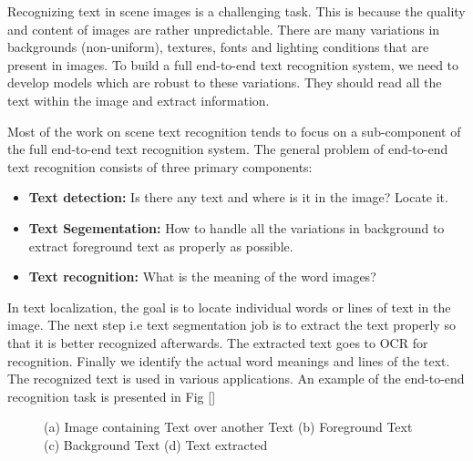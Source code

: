 Recognizing text in scene images is a challenging task.
This is because the quality and content of images are
rather unpredictable. There are many variations in backgrounds (non-uniform), textures,
fonts and lighting conditions that are present in images.
To build a full end-to-end text recognition system, we need to develop models
which are robust to these variations. They should read all the text within the image and extract information. 
 
Most of the work on scene text recognition tends to focus on a sub-component of the
full end-to-end text recognition system.
The general problem of end-to-end text recognition
consists of three primary components:  

\begin{itemize}
 \item \textbf{Text detection:} Is there any text and where is it in the image? Locate it.
\item \textbf{Text Segementation:} How to handle all the variations in background to extract 
foreground text as properly as possible.
\item \textbf{Text recognition:} What is the meaning of the word images?
\end{itemize}

In text
localization, the goal is to locate individual words or lines of text in the image.
The next step i.e text segmentation 
job is to extract the text properly so that it is better recognized afterwards. 
The extracted text goes to OCR for recognition.
Finally we identify the actual word meanings and
lines of the text. The recognized text is used in various applications. 
An example of the end-to-end recognition task is presented
in Fig \ref{}


\begin{figure}[t]
\centering
{}
\caption
{(a) Image containing Text over another Text (b) Foreground Text (c) Background Text (d)
Text extracted}
\end{figure}


